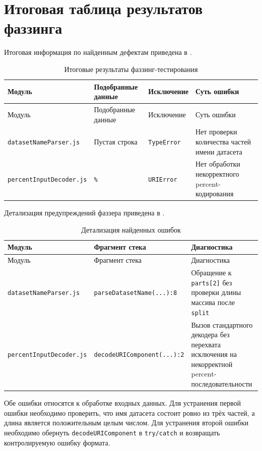 \section{Итоговая таблица результатов фаззинга} \label{ch2:sec3}

Итоговая информация по найденным дефектам приведена в .

\noindent
\begingroup
\centering
\small
\begin{longtable}[c]{|p{3.8cm}|p{3cm}|p{3.5cm}|p{4.7cm}|}
    \caption{Итоговые результаты фаззинг-тестирования}
    \label{tab:fuzz-results}
    \\
    \hline
    Модуль & Подобранные данные & Исключение & Суть ошибки \\ \hline
    \endfirsthead
    \hline
    Модуль & Подобранные данные & Исключение & Суть ошибки \\ \hline
    \endhead
    \hline
    \texttt{datasetNameParser.js} & Пустая строка & \texttt{TypeError} & Нет проверки количества частей имени датасета \\ \hline
    \texttt{percentInputDecoder.js} & \texttt{\%} & \texttt{URIError} & Нет обработки некорректного percent-кодирования \\ \hline
\end{longtable}
\normalsize
\endgroup

Детализация предупреждений фаззера приведена в .

\noindent
\begingroup
\centering
\small
\begin{longtable}[c]{|p{3.8cm}|p{4.6cm}|p{6cm}|}
    \caption{Детализация найденных ошибок}
    \label{tab:fuzz-details}
    \\
    \hline
    Модуль & Фрагмент стека & Диагностика \\ \hline
    \endfirsthead
    \hline
    Модуль & Фрагмент стека & Диагностика \\ \hline
    \endhead
    \hline
    \texttt{datasetNameParser.js} & \texttt{parseDatasetName(...):8} & Обращение к \texttt{parts[2]} без проверки длины массива после \texttt{split} \\ \hline
    \texttt{percentInputDecoder.js} & \texttt{decodeURIComponent(...):2} & Вызов стандартного декодера без перехвата исключения на некорректной percent-последовательности \\ \hline
\end{longtable}
\normalsize
\endgroup

Обе ошибки относятся к обработке входных данных. Для устранения первой ошибки
необходимо проверить, что имя датасета состоит ровно из трёх частей, а длина является
положительным целым числом. Для устранения второй ошибки необходимо обернуть
\texttt{decodeURIComponent} в \texttt{try/catch} и возвращать контролируемую ошибку
формата.

